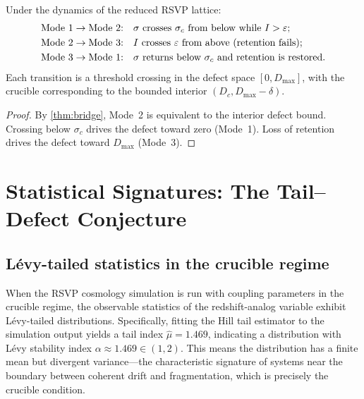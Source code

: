 \documentclass[12pt, oneside]{memoir}
\begin{document}
\begin{proposition}
\label{prop:transitions}
Under the dynamics of the reduced RSVP lattice:
\begin{align*}
  &\textup{Mode~1} \to \textup{Mode~2:}\quad
    \sigma \text{ crosses } \sigma_c \text{ from below while } I > \varepsilon; \\
  &\textup{Mode~2} \to \textup{Mode~3:}\quad
    I \text{ crosses } \varepsilon \text{ from above (retention fails)}; \\
  &\textup{Mode~3} \to \textup{Mode~1:}\quad
    \sigma \text{ returns below } \sigma_c \text{ and retention is restored}.
\end{align*}
Each transition is a threshold crossing in the defect space $[0, D_{\max}]$, with the
crucible corresponding to the bounded interior $(D_c, D_{\max} - \delta)$.
\end{proposition}

\begin{proof}
By \cref{thm:bridge}, Mode~2 is equivalent to the interior defect bound.  Crossing below
$\sigma_c$ drives the defect toward zero (Mode~1).  Loss of retention drives the defect
toward $D_{\max}$ (Mode~3).
\end{proof}

\chapter{Statistical Signatures: The Tail--Defect Conjecture}
\label{ch:tails}

\section{Lévy-tailed statistics in the crucible regime}

When the RSVP cosmology simulation is run with coupling parameters in the crucible
regime, the observable statistics of the redshift-analog variable exhibit Lévy-tailed
distributions.  Specifically, fitting the Hill tail estimator to the simulation output
yields a tail index $\hat{\mu} = 1.469$, indicating a distribution with Lévy stability
index $\alpha \approx 1.469 \in (1,2)$.  This means the distribution has a finite mean
but divergent variance---the characteristic signature of systems near the boundary
between coherent drift and fragmentation, which is precisely the crucible condition.
\end{document}
